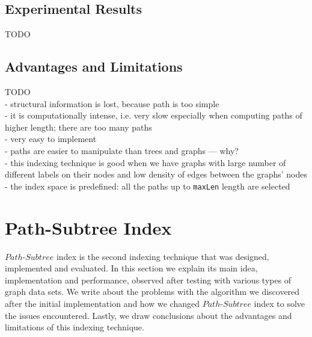 \documentclass{l4proj}
\begin{document}
\subsection{Experimental Results}
\label{path-index:experimental-results}
TODO


\subsection{Advantages and Limitations}
\label{path-index:advantages-limitations}
    TODO\\
    - structural information is lost, because path is too simple\\
	- it is computationally intense, i.e. very slow especially when computing paths of higher length; there are too many paths\\
    - very easy to implement\\
    - paths are easier to manipulate than trees and graphs --- why?\\
    - this indexing technique is good when we have graphs with large number of different labels on their nodes and low density of edges between the graphs' nodes\\
    - the index space is predefined: all the paths up to \texttt{maxLen} length are selected\\
\section{Path-Subtree Index}
\label{path-subtree-index}
  $Path$-$Subtree$ index is the second indexing technique that was designed, implemented and evaluated. In this section we explain its main idea, implementation and performance, observed after testing with various types of graph data sets. We write about the problems with the algorithm we discovered after the initial implementation and how we changed $Path$-$Subtree$ index to solve the issues encountered. Lastly, we draw conclusions about the advantages and limitations of this indexing technique.  
\end{document}
